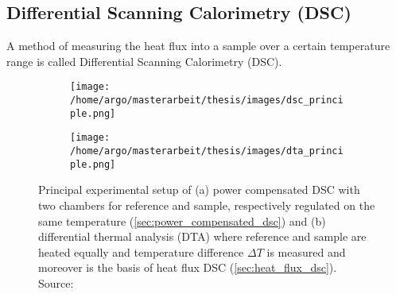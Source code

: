 \documentclass{scrartcl}[12pt, halfparskip]
\numberwithin{equation}{section}
\numberwithin{figure}{section}
\numberwithin{table}{section}
\begin{document}
\subsection{Differential Scanning Calorimetry (DSC)}
\label{sec:physics_DSC}
A method of measuring the heat flux into a sample over a certain temperature range is called Differential Scanning Calorimetry (DSC). 

\begin{figure}[h]
	\centering
	\begin{subfigure}{0.49\textwidth}
		\texttt{[image: /home/argo/masterarbeit/thesis/images/dsc\_principle.png]}
		\caption{}
		\label{fig:DSC_power_compensated_principle}
	\end{subfigure}
	\begin{subfigure}{0.49\textwidth}
		\texttt{[image: /home/argo/masterarbeit/thesis/images/dta\_principle.png]}
		\caption{}
		\label{fig:DTA_principle}
	\end{subfigure}
	\caption{Principal experimental setup of (a) power compensated DSC with two chambers for reference and sample, respectively regulated on the same temperature (\cref{sec:power_compensated_dsc}) and (b) differential thermal analysis (DTA) where reference and sample are heated equally and temperature difference $\Delta T$ is measured and moreover is the basis of heat flux DSC (\cref{sec:heat_flux_dsc}). Source: \cite{DSC_buch}}
\end{figure}
\end{document}
